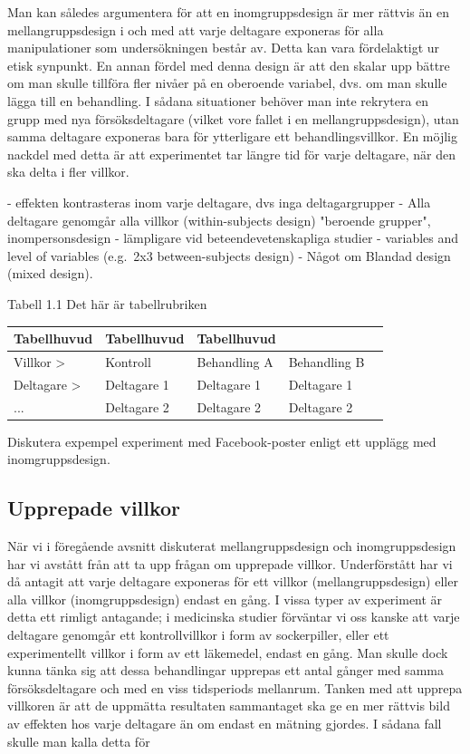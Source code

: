 \documentclass[
]{book}
\begin{document}
Man kan således argumentera för att en inomgruppsdesign är mer rättvis än en mellangruppsdesign i och med att varje deltagare exponeras för alla manipulationer som undersökningen består av. Detta kan vara fördelaktigt ur etisk synpunkt. En annan fördel med denna design är att den skalar upp bättre om man skulle tillföra fler nivåer på en oberoende variabel, dvs. om man skulle lägga till en behandling. I sådana situationer behöver man inte rekrytera en grupp med nya försöksdeltagare (vilket vore fallet i en mellangruppsdesign), utan samma deltagare exponeras bara för ytterligare ett behandlingsvillkor. En möjlig nackdel med detta är att experimentet tar längre tid för varje deltagare, när den ska delta i fler villkor.

- effekten kontrasteras inom varje deltagare, dvs inga deltagargrupper - Alla deltagare genomgår alla villkor (within-subjects design) "beroende grupper", inompersonsdesign - lämpligare vid beteendevetenskapliga studier - variables and level of variables (e.g.~2x3 between-subjects design) - Något om Blandad design (mixed design).

Tabell 1.1 Det här är tabellrubriken

\begin{longtable}[]{@{}lllll@{}}
\toprule
Tabellhuvud & Tabellhuvud & Tabellhuvud & &\tabularnewline
\midrule
\endhead
Villkor \textgreater{} & Kontroll & Behandling A & Behandling B &\tabularnewline
Deltagare \textgreater{} & Deltagare 1 & Deltagare 1 & Deltagare 1 &\tabularnewline
... & Deltagare 2 & Deltagare 2 & Deltagare 2 &\tabularnewline
\bottomrule
\end{longtable}

Diskutera expempel experiment med Facebook-poster enligt ett upplägg med inomgruppsdesign.

\hypertarget{sub07.5.5}{%
\subsection{Upprepade villkor}\label{sub07.5.5}}

När vi i föregående avsnitt diskuterat mellangruppsdesign och inomgruppsdesign har vi avstått från att ta upp frågan om upprepade villkor. Underförstått har vi då antagit att varje deltagare exponeras för ett villkor (mellangruppsdesign) eller alla villkor (inomgruppsdesign) endast en gång. I vissa typer av experiment är detta ett rimligt antagande; i medicinska studier förväntar vi oss kanske att varje deltagare genomgår ett kontrollvillkor i form av sockerpiller, eller ett experimentellt villkor i form av ett läkemedel, endast en gång. Man skulle dock kunna tänka sig att dessa behandlingar upprepas ett antal gånger med samma försöksdeltagare och med en viss tidsperiods mellanrum. Tanken med att upprepa villkoren är att de uppmätta resultaten sammantaget ska ge en mer rättvis bild av effekten hos varje deltagare än om endast en mätning gjordes. I sådana fall skulle man kalla detta för
\end{document}
